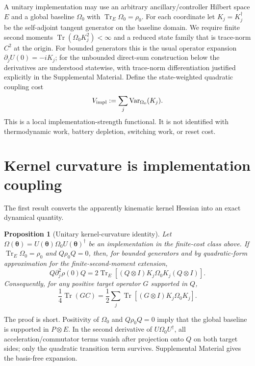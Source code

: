 \documentclass[aps,pra,preprint,nofootinbib]{revtex4-2}
\newtheorem{proposition}{Proposition}
\newcommand{\Tr}{\operatorname{Tr}}
\newcommand{\Var}{\operatorname{Var}}
\newcommand{\rhozero}{\rho_0}
\newcommand{\Omegazero}{\Omega_0}
\newcommand{\Vimpl}{V_{\rm impl}}
\newcommand{\Cker}{C}
\begin{document}
A unitary implementation may use an arbitrary ancillary/controller Hilbert space $E$ and a global baseline $\Omegazero$ with $\Tr_E\Omegazero=\rhozero$. For each coordinate let $K_j=K_j^\dagger$ be the self-adjoint tangent generator on the baseline domain. We require finite second moments $\Tr(\Omegazero K_j^2)<\infty$ and a reduced state family that is trace-norm $C^2$ at the origin. For bounded generators this is the usual operator expansion $\partial_jU(0)=-iK_j$; for the unbounded direct-sum construction below the derivatives are understood statewise, with trace-norm differentiation justified explicitly in the Supplemental Material. Define the state-weighted quadratic coupling cost
\begin{equation}
 \Vimpl:=\sum_j \Var_{\Omegazero}(K_j).
 \label{eq:Vdef}
\end{equation}
This is a local implementation-strength functional. It is not identified with thermodynamic work, battery depletion, switching work, or reset cost.

\section{Kernel curvature is implementation coupling}

The first result converts the apparently kinematic kernel Hessian into an exact dynamical quantity.

\begin{proposition}[Unitary kernel-curvature identity]
Let $\Omega(\bm\theta)=U(\bm\theta)\Omegazero U(\bm\theta)^\dagger$ be an implementation in the finite-cost class above. If $\Tr_E\Omegazero=\rhozero$ and $Q\rhozero Q=0$, then, for bounded generators and by quadratic-form approximation for the finite-second-moment extension,
\begin{equation}
 Q\partial_j^2\rho(0)Q
 =2\Tr_E\!\left[(Q\otimes I)K_j\Omegazero K_j(Q\otimes I)\right].
 \label{eq:kernelidentity}
\end{equation}
Consequently, for any positive target operator $G$ supported in $Q$,
\begin{equation}
 \frac14\Tr(G\Cker)
 =\frac12\sum_j\Tr\!\left[(G\otimes I)K_j\Omegazero K_j\right].
 \label{eq:weightedidentity}
\end{equation}
\end{proposition}

\noindent
The proof is short. Positivity of $\Omegazero$ and $Q\rhozero Q=0$ imply that the global baseline is supported in $P\otimes E$. In the second derivative of $U\Omegazero U^\dagger$, all acceleration/commutator terms vanish after projection onto $Q$ on both target sides; only the quadratic transition term survives. Supplemental Material gives the basis-free expansion.
\end{document}

